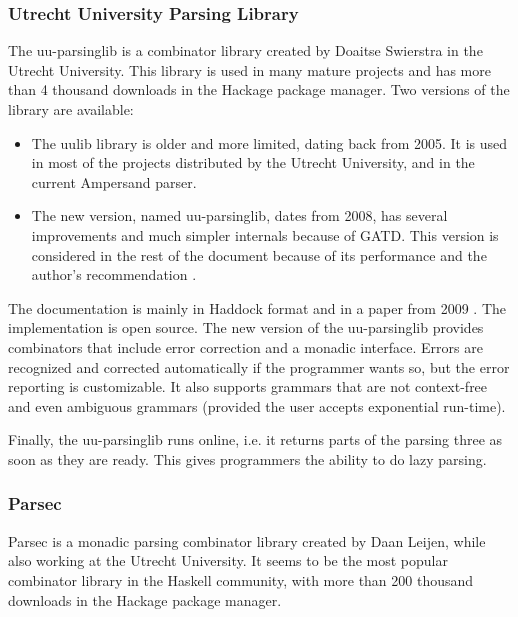 \subsubsection{Utrecht University Parsing Library}
%
%
%
The uu-parsinglib is a combinator library created by Doaitse Swierstra in the Utrecht University.
This library is used in many mature projects and has more than 4 thousand downloads in the Hackage package manager.
Two versions of the library are available:
\begin{itemize}
  \item The uulib library is older and more limited, dating back from 2005.
    It is used in most of the projects distributed by the Utrecht University, and in the current Ampersand parser.
  \item The new version, named uu-parsinglib, dates from 2008, has several improvements and much simpler internals because of GATD.
    This version is considered in the rest of the document because of its performance  and the author's recommendation .
\end{itemize}
%
The documentation is mainly in Haddock format and in a paper from 2009 .
The implementation is open source.
The new version of the uu-parsinglib provides combinators that include error correction and a monadic interface.
Errors are recognized and corrected automatically if the programmer wants so, but the error reporting is customizable.
It also supports grammars that are not context-free and even ambiguous grammars (provided the user accepts exponential run-time).

Finally, the uu-parsinglib runs online, i.e. it returns parts of the parsing three as soon as they are ready.
This gives programmers the ability to do lazy parsing.

\subsubsection{Parsec}
%
Parsec is a monadic parsing combinator library created by Daan Leijen, while also working at the Utrecht University.
It seems to be the most popular combinator library in the Haskell community, with more than 200 thousand downloads in the Hackage package manager.

